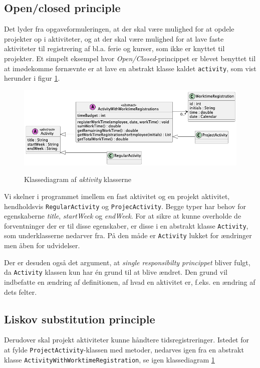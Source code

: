 \subsection{Open/closed principle} \label{sec:solid_o}
Det lyder fra opgaveformuleringen, at der skal være mulighed for at opdele projekter op i aktiviteter, og at der skal være mulighed for at lave faste aktiviteter til registrering af bl.a. ferie og kurser, som ikke er knyttet til projekter. Et simpelt eksempel hvor \textit{Open/Closed}-princippet er blevet benyttet til at imødekomme førnævnte er at lave en abstrakt klasse kaldet \texttt{activity}, som vist herunder i figur \ref{fig:class_activity_example}.

\begin{figure}[H]
    \centering
    \caption{Klassediagram af \textit{aktivity} klasserne}
    \includegraphics[width = \textwidth, keepaspectratio]{TaskFusion/out/assets/diagrams/class_liskov_model_example/liskov_model_example.png}
    \label{fig:class_activity_example}
\end{figure}
Vi skelner i programmet imellem en fast aktivitet og en projekt aktivitet, hendholdsvis \texttt{RegularActivity} og \texttt{ProjecActivity}. Begge typer har behov for egenskaberne \textit{title}, \textit{startWeek} og \textit{endWeek}. For at sikre at kunne overholde de forventninger der er til disse egenskaber, er disse i en abstrakt klasse \texttt{Activity}, som underklasserne nedarver fra. På den måde er \texttt{Activity} lukket for ændringer men åben for udvidelser. 

Der er desuden også det argument, at \textit{single responsibilty princippet} bliver fulgt, da \texttt{Activity} klassen kun har én grund til at blive ændret. Den grund vil indbefatte en ændring af definitionen, af hvad en aktivitet er, f.eks. en ændring af dets felter.

\subsection{Liskov substitution principle} \label{sec:solid_l}
 Derudover skal projekt aktiviteter kunne håndtere tidsregistreringer. Istedet for at fylde \texttt{ProjectActivity}-klassen med metoder, nedarves igen fra en abstrakt klasse \texttt{ActivityWithWorktimeRegistration}, se igen klassediagram \ref{fig:class_activity_example}
 
